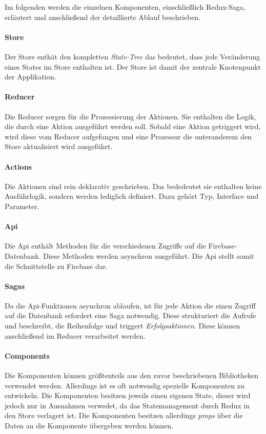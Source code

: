 Im folgenden werden die einzelnen Komponenten, einschließlich Redux-Saga, erläutert und
anschließend der detaillierte Ablauf beschrieben.

\paragraph{Store}
Der Store enthät den kompletten \textit{State-Tree} das bedeutet, dass jede Veränderung
eines States im Store enthalten ist. Der Store ist damit der zentrale Knotenpunkt der
Applikation.

\paragraph{Reducer}
Die Reducer sorgen für die Prozessierung der Aktionen. Sie enthalten die Logik, die
durch eine Aktion ausgeführt werden soll. Sobald eine Aktion getriggert wird, wird diese vom
Reducer aufgefangen und eine Prozessur die unteranderem den Store aktualisiert wird ausgeführt.

\paragraph{Actions}
Die Aktionen sind rein deklarativ geschrieben. Das bededeutet sie enthalten keine Ausführlogik,
sondern werden lediglich definiert. Dazu gehört Typ, Interface und Parameter.

\paragraph{Api}
Die Api enthält Methoden für die verschiedenen Zugriffe auf die Firebase-Datenbank.
Diese Methoden werden asynchron ausgeführt. Die Api stellt somit die Schnittstelle
zu Firebase dar.

\paragraph{Sagas}
Da die Api-Funktionen asynchron ablaufen, ist für jede Aktion die einen Zugriff auf die
Datenbank erfordert eine Saga notwendig. Diese strukturiert die Aufrufe und beschreibt,
die Reihenfolge und triggert \textit{Erfolgsaktionen}. Diese können anschließend im Reducer
verarbeitet werden.

\paragraph{Components}
Die Komponenten können größtenteils aus den zuvor beschriebenen Bibliotheken verwendet werden.
Allerdings ist es oft notwendig spezielle Komponenten zu entwickeln. Die Komponenten besitzen
jeweils einen eigenen State, dieser wird jedoch nur in Ausnahmen verwedet, da das Statemanagement
durch Redux in den Store verlagert ist. Die Komponenten besitzen allerdings \textit{props} über die
Daten an die Komponente übergeben werden können.

